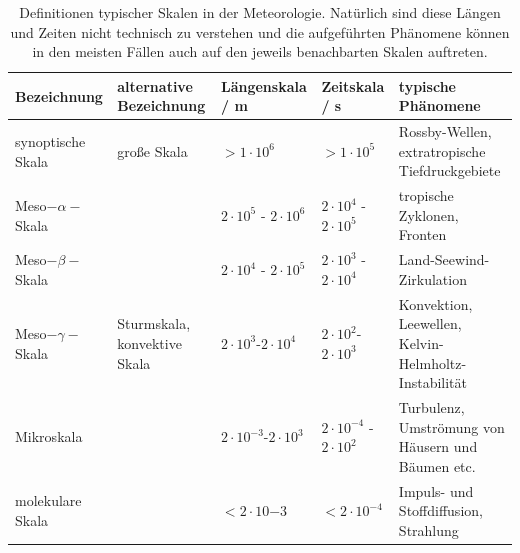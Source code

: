 \documentclass{book}
\begin{document}
\renewcommand{\arraystretch}{1.2}
\begin{table}
\centering
\begin{tabular}{|>{\centering}p{2.5 cm}|>{\centering}p{2.0 cm}|>{\centering}p{2.0 cm}|>{\centering}p{2.0 cm}|>{\centering}p{4.0 cm}|}
\hline \textbf{Bezeichnung} & \textbf{alternative Bezeichnung} & \textbf{Längenskala / m} & \textbf{Zeitskala / s} & \textbf{typische Phänomene} \tabularnewline
\hline\hline synoptische Skala & große Skala & $> 1\cdot 10^6$ & $> 1\cdot 10^5$ & Rossby-Wellen, extratropische Tiefdruckgebiete \tabularnewline
\hline Meso$-\alpha-$Skala & & $2\cdot 10^{5}$ - $2\cdot 10^6$ & $2\cdot 10^{4}$ - $2\cdot 10^5$ & tropische Zyklonen, Fronten \tabularnewline
\hline Meso$-\beta-$Skala & & $2\cdot 10^{4}$ - $2\cdot 10^5$ & $2\cdot 10^{3}$ - $2\cdot 10^4$ & Land-Seewind-Zirkulation \tabularnewline
\hline Meso$-\gamma-$Skala & Sturmskala, konvektive Skala & $2\cdot 10^{3}$-$2\cdot 10^4$ & $2\cdot 10^{2}$-$2\cdot 10^3$ & Konvektion, Leewellen, Kelvin-Helmholtz-Instabilität\tabularnewline
\hline Mikroskala & & $2\cdot 10^{-3}$-$2\cdot 10^3$ & $2\cdot 10^{-4}$ - $2\cdot 10^2$ & Turbulenz, Umströmung von Häusern und Bäumen etc. \tabularnewline
\hline molekulare Skala & & $< 2\cdot 10{-3}$ & $< 2\cdot 10^{-4}$ & Impuls- und Stoffdiffusion, Strahlung \tabularnewline
\hline 
\end{tabular}
\caption{Definitionen typischer Skalen in der Meteorologie. Natürlich sind diese Längen und Zeiten nicht technisch zu verstehen und die aufgeführten Phänomene können in den meisten Fällen auch auf den jeweils benachbarten Skalen auftreten.}
\label{tab:scales}
\end{table}
\renewcommand{\arraystretch}{1}
%
\renewcommand{\arraystretch}{1.2}
\end{document}
